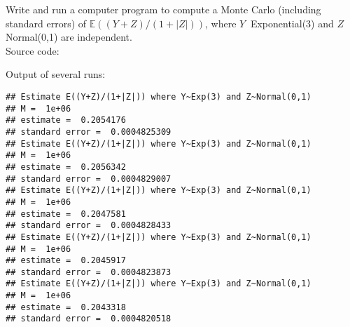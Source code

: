 
Write and run a computer program to compute a Monte Carlo (including standard errors) of $\mathbb{E}((Y+Z)/(1+|Z|))$, where $Y~$ Exponential(3) and $Z~$ Normal(0,1) are independent.\\
Source code:\\
\begin{knitrout}
\color{fgcolor}\begin{kframe}
\begin{alltt}
 \hlkwb{=} \hlstd{(}\hlstd{,}\hlopt{+}\hlopt{/}\hlstd{(}\hlopt{+}

\hlkwb{=}\hlopt{^}

 \hlkwb{=} \hlstd{)}
 \hlkwb{=} 
 \hlkwb{=} 
 \hlkwb{=} 
 \hlkwb{=} \hlopt{/}
\hlstd{(}\hlstd{)}
\hlstd{(}\hlstd{)}
\hlstd{(}\hlstd{)}
\hlstd{(}\hlstd{)}
\end{alltt}
\end{kframe}
\end{knitrout}
Output of several runs:
\begin{knitrout}
\color{fgcolor}\begin{kframe}
\begin{verbatim}
## Estimate E((Y+Z)/(1+|Z|)) where Y~Exp(3) and Z~Normal(0,1)
## M =  1e+06 
## estimate =  0.2054176 
## standard error =  0.0004825309
## Estimate E((Y+Z)/(1+|Z|)) where Y~Exp(3) and Z~Normal(0,1)
## M =  1e+06 
## estimate =  0.2056342 
## standard error =  0.0004829007
## Estimate E((Y+Z)/(1+|Z|)) where Y~Exp(3) and Z~Normal(0,1)
## M =  1e+06 
## estimate =  0.2047581 
## standard error =  0.0004828433
## Estimate E((Y+Z)/(1+|Z|)) where Y~Exp(3) and Z~Normal(0,1)
## M =  1e+06 
## estimate =  0.2045917 
## standard error =  0.0004823873
## Estimate E((Y+Z)/(1+|Z|)) where Y~Exp(3) and Z~Normal(0,1)
## M =  1e+06 
## estimate =  0.2043318 
## standard error =  0.0004820518
\end{verbatim}
\end{kframe}
\end{knitrout}
